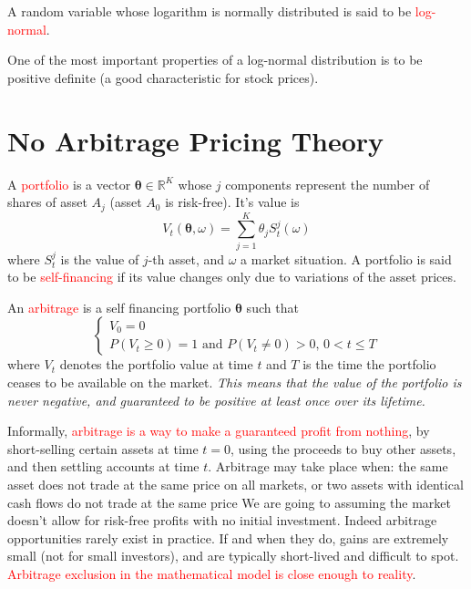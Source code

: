 \documentclass[12pt,a4paper]{book}
\begin{document}
A random variable whose logarithm is normally distributed is said to be \textcolor{red}{log-normal}.
			
One of the most important properties of a log-normal distribution is to be positive definite (a good characteristic for stock prices).

\section{No Arbitrage Pricing Theory}

A \textcolor{red}{portfolio} is a vector $\mathbf{\theta}\in \mathbb{R}^K$ whose $j$ components represent the number of shares of asset $A_j$ (asset $A_0$ is risk-free). It's value is
\begin{equation}
V_t(\mathbf{\theta}, \omega)=\sum_{j=1}^K\theta_jS^j_t(\omega)
\end{equation} 
where $S_t^j$ is the value of $j$-th asset, and $\omega$ a market situation. A portfolio is said to be \textcolor{red}{self-financing} if its value changes only due to variations of the asset prices.

An \textcolor{red}{arbitrage} is a self financing portfolio $\mathbf{\theta}$ such that
\begin{equation}
\begin{cases}
V_0 = 0 \\
P(V_{t}\geq 0)=1\text{ and }P(V_{t}\neq 0)>0,\,0<t\leq T
\end{cases}
\end{equation}
where $V_t$ denotes the portfolio value at time $t$ and $T$ is the time the portfolio ceases to be available on the market. 
\emph{This means that the value of the portfolio is never negative, and guaranteed to be positive at least once over its lifetime.}

Informally, \textcolor{red}{arbitrage is a way to make a guaranteed profit from nothing}, by short-selling certain assets at time $t = 0$, using the proceeds to buy other assets, and then settling accounts at time $t$. 
Arbitrage may take place when: the same asset does not trade at the same price on all markets, or two assets with identical cash flows do not trade at the same price
We are going to assuming the market doesn't allow for risk-free profits with no initial investment.
Indeed arbitrage opportunities rarely exist in practice. If and when they do, gains are extremely small (not for small investors), and are typically short-lived and difficult to spot. 
\textcolor{red}{Arbitrage exclusion in the mathematical model is close enough to reality}.
\end{document}
